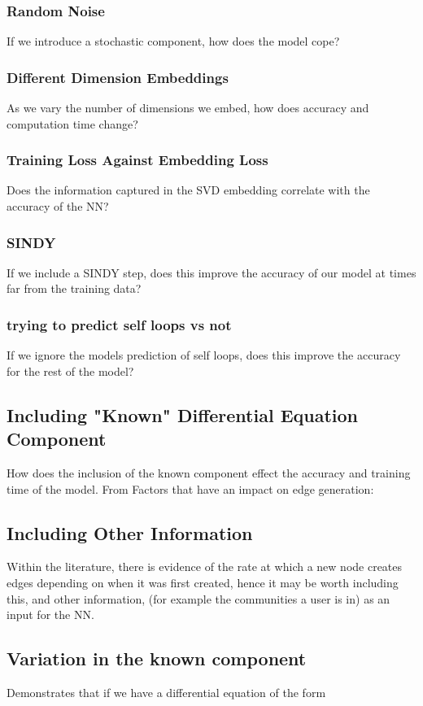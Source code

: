 \documentclass[12pt]{article}
\begin{document}
            \subsubsection{Random Noise}
                If we introduce a stochastic component, how does the model cope?
            \subsubsection{Different Dimension Embeddings}
                As we vary the number of dimensions we embed, how does accuracy and computation time change?
            \subsubsection{Training Loss Against Embedding Loss}
                Does the information captured in the SVD embedding correlate with the accuracy of the NN?
            \subsubsection{SINDY}
                If we include a SINDY step, does this improve the accuracy of our model at times far from the training data?
            \subsubsection{trying to predict self loops vs not}
                If we ignore the models prediction of self loops, does this improve the accuracy for the rest of the model?
            \subsection{Including "Known" Differential Equation Component}
                How does the inclusion of the known component effect the accuracy and training time of the model.
                From \cite{garg2009evolution}
                Factors that have an impact on edge generation:
                    
    \subsection{Including Other Information}
        Within the literature, there is evidence of the rate at which a new node creates edges depending on when it was first created, hence it may be worth including this, and other information, (for example the communities a user is in) as an input for the NN.
    \subsection{Variation in the known component}
        \cite{SciML_C_Rak} Demonstrates that if we have a differential equation of the form
        
\end{document}
